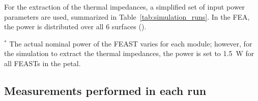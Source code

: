 For the extraction of the thermal impedances, a simplified set of input power parameters are used,
summarized in Table~\ref{tab:simulation_runs}.
In the FEA, the power is distributed over all 6 surfaces ().

\let\arraystretcha\arraystretch
\renewcommand\arraystretch{1.4} %
\begin{table}[h!]
\footnotesize
\begin{center}
\end{center}
\caption{ Description of the 7 thermal simulations required to obtain the thermal impedances.
}
\label{tab:simulation_runs}
\end{table}
\let\arraystretch\arraystretcha

$^*$ The actual nominal power of the FEAST varies for each module; however, for the simulation to extract
the thermal impedances, the power is set to 1.5~W for all FEASTs in the petal.\\






\subsection{Measurements performed in each run}

